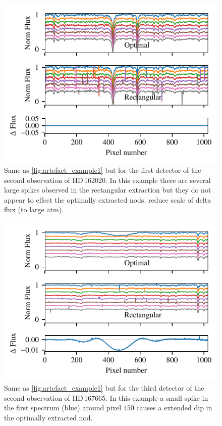  \begin{figure}
     \centering
     \includegraphics[width=0.7\linewidth]{figures/appendix/bp_plots/extraction_comparision_HD162020-2_chip_1}
     \caption{Same as \cref{fig:artefact_example1} but for the first detector of the second observation of {HD\,162020}. In this example there are several large spikes observed in the rectangular extraction but they do not appear to effect the optimally extracted nods. {\red{} reduce scale of delta flux (to large atm)}.}
     \label{fig:artefact_example2}
 \end{figure}
 \begin{figure}
     \centering
     \includegraphics[width=0.7\linewidth]{figures/appendix/bp_plots/extraction_comparision_HD167665-1b_chip_3}
     \caption{Same as \cref{fig:artefact_example1} but for the third detector of the second observation of {HD\,167665}. In this example a small spike in the first spectrum (blue) around pixel 450 causes a extended dip in the optimally extracted nod.}
     \label{fig:artefact_example3}
 \end{figure}
